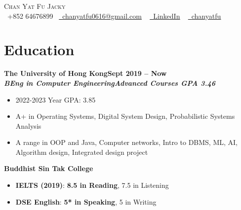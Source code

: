 \documentclass[a4paper,10pt]{article}
\begin{document}
\begin{center}
  {\Huge \scshape Chan Yat Fu Jacky} \\ \vspace{5pt}
  \small \raisebox{-0.1\height}\faPhone\ +852 64676899~ \href{mailto:chanyatfu0616@gmail.com}{\raisebox{-0.2\height}\faEnvelope\  \underline{chanyatfu0616@gmail.com}} ~
  \href{https://www.linkedin.com/in/yat-fu-chan-255b59306/}{\raisebox{-0.2\height}\faLinkedin\ \underline{LinkedIn}}  ~
  \href{https://github.com/chanyatfu}{\raisebox{-0.2\height}\faGithub\ \underline{chanyatfu}}
  \vspace{-3pt}
\end{center}

\newcommand*{\bb}[2][]{{\small\bfseries#2\hfill{\small#1}}\\}
\newcommand*{\cc}[2][]{{\bfseries\textit{\small#2}\hfill\textit{\small#1}}\\}
\newenvironment{tightitemize}{\begin{itemize}[leftmargin=2em,topsep=1pt,partopsep=1pt,noitemsep]\small}{\end{itemize}\vspace*{2pt}}

\section{Education}

\bb[Sept 2019 -- Now]{The University of Hong Kong}
\cc[Advanced Courses GPA 3.46]{BEng in Computer Engineering}
\begin{tightitemize}
  \item 2022-2023 Year GPA: 3.85
  \item A+ in Operating Systems, Digital System Design, Probabilistic Systems Analysis
  \item A range in OOP and Java, Computer networks, Intro to DBMS, ML, AI, Algorithm design, Integrated design project
\end{tightitemize}

\bb{Buddhist Sin Tak College}
\begin{tightitemize}
  \item \textbf{IELTS (2019)}: \textbf{8.5 in Reading}, 7.5 in Listening
  \item \textbf{DSE English}: \textbf{5* in Speaking}, 5 in Writing
\end{tightitemize}


\newcommand{\certificate}[3]{\textbf{#1} -- #2 [#3]}
\end{document}
